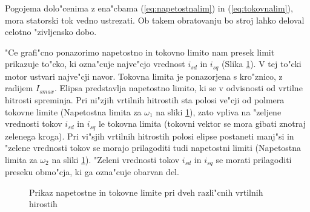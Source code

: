 \documentclass[journal,a4paper,twoside]{sty/IEEEtran}
\begin{document}
Pogojema dolo"cenima z ena"cbama (\ref{eq:napetostnalim}) in (\ref{eq:tokovnalim}), mora statorski tok vedno ustrezati. Ob takem obratovanju bo stroj lahko deloval celotno "zivljensko dobo.\cite{vas}

"Ce grafi"cno ponazorimo napetostno in tokovno limito nam presek limit prikazuje to"cko, ki ozna"cuje najve"cjo vrednost $i_{sd}$ in $i_{sq}$ (Slika \ref{fig:napetostna_tokovna_limita_slika}). V tej to"cki motor ustvari najve"cji navor. Tokovna limita je ponazorjena s kro"znico, z radijem $I_{smax}$. Elipsa predstavlja napetostno limito, ki se v odvisnosti od vrtilne hitrosti spreminja. Pri ni"zjih vrtilnih hitrostih sta polosi ve"cji od polmera tokovne limite (Napetostna limita za $\omega_1$ na sliki \ref{fig:napetostna_tokovna_limita_slika}), zato vpliva na "zeljene vrednosti tokov $i_{sd}$ in $i_{sq}$ le tokovna limita (tokovni vektor se mora gibati znotraj zelenega kroga). Pri vi"sjih vrtilnih hitrostih polosi elipse postaneti manj"si in "zelene vrednosti tokov se morajo prilagoditi tudi napetostni limiti (Napetostna limita za $\omega_2$ na sliki \ref{fig:napetostna_tokovna_limita_slika}). "Zeleni vrednosti tokov $i_{sd}$ in $i_{sq}$ se morati prilagoditi preseku obmo"cja, ki ga ozna"cuje obarvan del. 

\begin{figure}
\caption{Prikaz napetostne in tokovne limite pri dveh razli"cnih vrtilnih hirostih}
\label{fig:napetostna_tokovna_limita_slika}
\end{figure}
\end{document}

